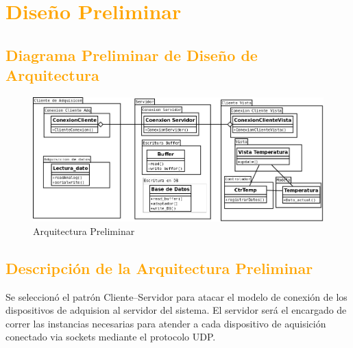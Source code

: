 
\newpage
\section{\textcolor{orange}{Diseño Preliminar}}
\subsection{\textcolor{orange}{Diagrama Preliminar de Diseño de Arquitectura}}
\begin{figure}[h!]
 \begin{center}
  \includegraphics[width=1\textwidth,keepaspectratio=true]{./img/arqprelim.png}
  \caption{Arquitectura Preliminar}
  \label{fig:esquema}
 \end{center}
\end{figure}

\subsection{\textcolor{orange}{Descripción de la Arquitectura Preliminar}}
Se seleccionó el patrón Cliente–Servidor para atacar el modelo de conexión de
los dispositivos de adquision al servidor del sistema. El servidor será el
encargado de correr las instancias necesarias para atender a cada dispositivo
de aquisición conectado via sockets mediante el protocolo UDP.

